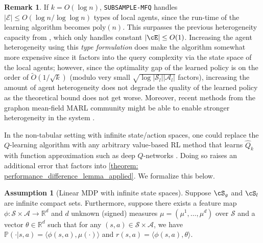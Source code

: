 \documentclass{article}
\newcommand\R{\mathbb{R}}
\theoremstyle{plain}
\theoremstyle{definition}
\newtheorem{assumption}[theorem]{Assumption}
\newtheorem{remark}[theorem]{Remark}
\begin{document}
\begin{remark}
    If $k=O(\log n)$, \texttt{SUBSAMPLE-MFQ} handles $|\mathcal{E}|\leq O(\log n/\log \log n)$ types of local agents, since the run-time of the learning algorithm becomes $\mathrm{poly}(n)$. This surpasses the previous heterogeneity capacity from \citet{10.5555/3586589.3586718}, which only handles constant $|\cE|\leq O(1)$. Increasing the agent heterogeneity using this \emph{type formulation} does make the algorithm somewhat more expensive since it factors into the query complexity via the state space of the local agents; however, since the optimality gap of the learned policy is on the order of $\tilde{O}(1/\sqrt{k})$ (modulo very small $\sqrt{\log |\mathcal{S}_l||\mathcal{A}_l|}$ factors), increasing the amount of agent heterogeneity does not degrade the quality of the learned policy as the theoretical bound does not get worse.  Moreover, recent methods from the graphon mean-field MARL community might be able to enable stronger heterogeneity in the system \citep{cui2022learning,anand2025feelgoodthompsonsamplingcontextual,Hu_Wei_Yan_Zhang_2023}.
\end{remark}
In the non-tabular setting with infinite state/action spaces, one could replace the $Q$-learning algorithm with any arbitrary value-based RL method that learns $\hat{Q}_k$ with function approximation \citep{Sutton_McAllester_Singh_Mansour_1999} such as deep $Q$-networks  \citep{Silver_Huang_Maddison_Guez_Sifre_van_den_Driessche_Schrittwieser_Antonoglou_Panneershelvam_Lanctot_et_al._2016}. Doing so raises an additional error that factors into  \cref{theorem: performance_difference_lemma_applied}. We formalize this below.

\begin{assumption}[Linear MDP with infinite state spaces]  Suppose $\cS_g$ and $\cS_l$ are infinite compact sets. Furthermore, suppose there exists a feature map $\phi:\mathcal{S}\times\mathcal{A}\to\mathbb{R}^d$ and $d$ unknown (signed) measures $\mu = (\mu^1,\dots,\mu^d)$ over $\mathcal{S}$ and a vector $\theta\in\R^d$ such that for any $(s,a)\in \mathcal{S}\times \mathcal{A}$, we have $\mathbb{P}(\cdot|s,a) = \langle \phi(s,a),\mu(\cdot)\rangle$ and $r(s,a) = \langle \phi(s,a),\theta\rangle$.
\end{assumption}
\end{document}
